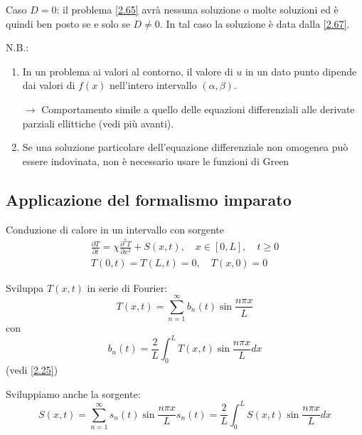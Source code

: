 \documentclass[a4paper,11pt]{report}
\begin{document}
\smallskip

Caso $D=0$: il problema \eqref{2.65} avr\`a nessuna soluzione o molte soluzioni ed \`e quindi ben posto se e solo se $D\neq 0$. In tal caso la soluzione \`e data dalla \eqref{2.67}.

\medskip

N.B.:
\begin{enumerate}[label=(\roman*)]
\item In un problema ai valori al contorno, il valore di $u$ in un dato punto dipende dai valori di $f(x)$ nell'intero intervallo $(\alpha,\beta)$. 

$\rightarrow$ Comportamento simile a quello delle equazioni differenziali alle derivate parziali ellittiche (vedi pi\`u avanti).%
\item Se una soluzione particolare dell'equazione differenziale non omogenea pu\`o essere indovinata, non \`e necessario usare le funzioni di Green
\end{enumerate}

\subsection{Applicazione del formalismo imparato}

Conduzione di calore in un intervallo con sorgente
\begin{equation}
\begin{gathered}
\frac{\partial T}{\partial t} = \chi \frac{\partial^2 T}{\partial x^2} + S(x,t), \quad x \in [0,L], \quad t\geq 0\\
T(0,t)=T(L,t)=0, \quad T(x,0)=0
\end{gathered}
\label{2.68}
\end{equation}

Sviluppa $T(x,t)$ in serie di Fourier:
\begin{equation}
T(x,t)=\sum_{n=1}^\infty b_n(t)\sin\frac{n\pi x}{L}
\label{2.69}
\end{equation}
con 
\begin{equation}
b_n(t)=\frac{2}{L}\int_0^L T(x,t) \sin \frac{n\pi x}{L}dx
\end{equation}
(vedi \eqref{2.25})

Sviluppiamo anche la sorgente:
\begin{subequations}
\begin{equation}
S(x,t)=\sum_{n=1}^\infty s_n(t)\sin\frac{n\pi x}{L}
\label{2.71a}
\end{equation}
\begin{equation}
s_n(t)=\frac{2}{L}\int_0^L S(x,t) \sin \frac{n\pi x}{L}dx
\label{2.71b}
\end{equation}
\end{subequations}
\end{document}
